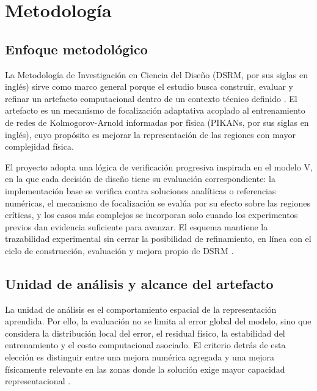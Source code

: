 \chapter{Metodología}
\label{sec:metodologia}

\section{Enfoque metodológico}
\label{subsec:enfoque-metodologico}

La Metodología de Investigación en Ciencia del Diseño (DSRM, por sus siglas en inglés) sirve como marco general porque el estudio busca construir, evaluar y refinar un artefacto computacional dentro de un contexto técnico definido \cite{peffers2007dsrm}. El artefacto es un mecanismo de focalización adaptativa acoplado al entrenamiento de redes de Kolmogorov-Arnold informadas por física (PIKANs, por sus siglas en inglés), cuyo propósito es mejorar la representación de las regiones con mayor complejidad física.

El proyecto adopta una lógica de verificación progresiva inspirada en el modelo V, en la que cada decisión de diseño tiene su evaluación correspondiente: la implementación base se verifica contra soluciones analíticas o referencias numéricas, el mecanismo de focalización se evalúa por su efecto sobre las regiones críticas, y los casos más complejos se incorporan solo cuando los experimentos previos dan evidencia suficiente para avanzar. El esquema mantiene la trazabilidad experimental sin cerrar la posibilidad de refinamiento, en línea con el ciclo de construcción, evaluación y mejora propio de DSRM \cite{peffers2007dsrm}.

\section{Unidad de análisis y alcance del artefacto}
\label{subsec:unidad-analisis}

La unidad de análisis es el comportamiento espacial de la representación aprendida. Por ello, la evaluación no se limita al error global del modelo, sino que considera la distribución local del error, el residual físico, la estabilidad del entrenamiento y el costo computacional asociado. El criterio detrás de esta elección es distinguir entre una mejora numérica agregada y una mejora físicamente relevante en las zonas donde la solución exige mayor capacidad representacional \cite{grossmann2024,krishnapriyan2021,shukla2024fair}.

